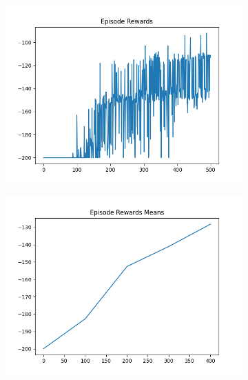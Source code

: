 \begin{figure}[H]
    \centering
    \begin{subfigure}{.47\linewidth}
        \centering
        \includegraphics[width=\textwidth]{mountain/2024-06-15_12-43-21_dqn_mountaincar_episode_rewards.png}
    \end{subfigure}
    \begin{subfigure}{.47\linewidth}
        \centering
        \includegraphics[width=\textwidth]{mountain/2024-06-15_12-43-21_dqn_mountaincar_episode_rewards_means.png}
    \end{subfigure}
    \begin{subfigure}{.47\linewidth}
        \centering

\end{subfigure}
\end{figure}
